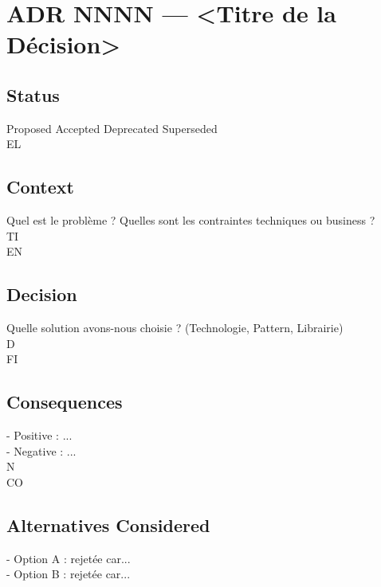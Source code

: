 \section*{ADR NNNN --- \textless{}Titre de la Décision\textgreater{}}
\vspace{0.5em}
\vspace{0.5em}
\subsection*{Status}
Proposed \textbar{} Accepted \textbar{} Deprecated \textbar{} Superseded\\
\vspace{0.5em}
\vspace{0.5em}
\vspace{0.5em}
\vspace{0.5em}
EL\\
\subsection*{Context}
Quel est le problème ? Quelles sont les contraintes techniques ou business ?\\
\vspace{0.5em}
\vspace{0.5em}
\vspace{0.5em}
\vspace{0.5em}
TI\\
EN\\
\subsection*{Decision}
Quelle solution avons-nous choisie ? (Technologie, Pattern, Librairie)\\
\vspace{0.5em}
\vspace{0.5em}
\vspace{0.5em}
\vspace{0.5em}
D\\
FI\\
\subsection*{Consequences}
- Positive : ...\\
- Negative : ...\\
N\\
CO\\
\subsection*{Alternatives Considered}
- Option A : rejetée car...\\
- Option B : rejetée car...\\
\vspace{0.5em}
\vspace{0.5em}
